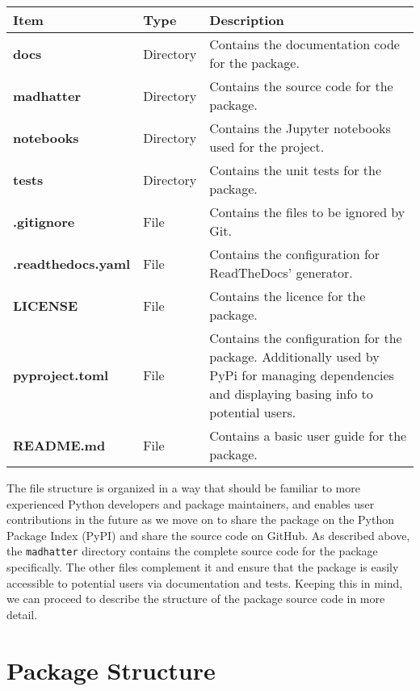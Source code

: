 \begin{table}[htbp]
    \centering
    \begin{tabular}{p{}p{}p{}}
        \toprule 
        \textbf{Item} & \textbf{Type}  & \textbf{Description} \\
        \midrule
        \textbf{docs} & Directory & Contains the documentation code for the package. \\
        \textbf{madhatter} & Directory & Contains the source code for the package. \\
        \textbf{notebooks} & Directory & Contains the Jupyter notebooks used for the project. \\
        \textbf{tests} & Directory & Contains the unit tests for the package. \\
        \textbf{.gitignore} & File & Contains the files to be ignored by Git. \\
        \textbf{.readthedocs.yaml} & File & Contains the configuration for ReadTheDocs' generator. \\
        \textbf{LICENSE} & File & Contains the licence for the package. \\
        \textbf{pyproject.toml} & File & Contains the configuration for the package. Additionally used by PyPi for managing dependencies and displaying basing info to potential users. \\
        \textbf{README.md} & File & Contains a basic user guide for the package. \\

    \end{tabular}
\end{table}

The file structure is organized in a way that should be familiar to more experienced Python developers and package maintainers, and enables user contributions in the future as we move on to share the package on the Python Package Index (PyPI) and share the source code on GitHub. As described above, the \texttt{madhatter} directory contains the complete source code for the package specifically. The other files complement it and ensure that the package is easily accessible to potential users via documentation and tests. Keeping this in mind, we can proceed to describe the structure of the package source code in more detail.

\section{Package Structure}

